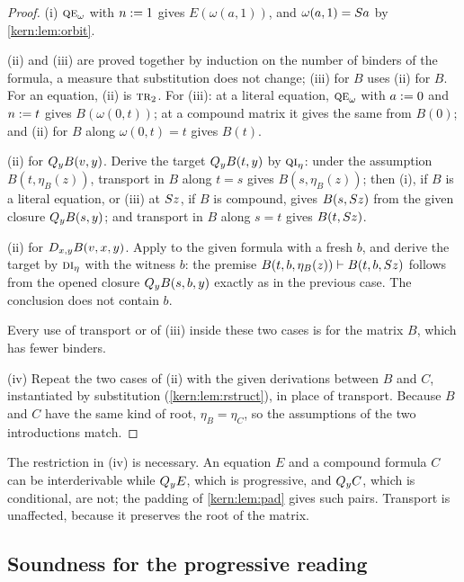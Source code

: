 \begin{proof}
(i) $\rulename{QE}_{\omega}$ with $n\mathrel{:=} 1$ gives $E(\omega(a,1))$, and
$\omega(a,1)=S a$ by \cref{kern:lem:orbit}.

(ii) and (iii) are proved together by induction on the number of binders of
the formula, a measure that substitution does not change; (iii) for $B$ uses
(ii) for $B$.  For an equation, (ii) is $\rulename{Tr}_{2}$.  For (iii): at
a literal equation, $\rulename{QE}_{\omega}$ with $a\mathrel{:=} 0$ and
$n\mathrel{:=} t$ gives $B(\omega(0,t))$; at a compound matrix it gives the same
from $B(0)$; and (ii) for $B$ along $\omega(0,t)=t$ gives $B(t)$.

(ii) for $Q_{y}B(v,y)$.  Derive the target $Q_{y}B(t,y)$ by
$\rulename{QI}_{\eta}$: under the assumption $B(t,\eta_B(z))$, transport in
$B$ along $t=s$ gives $B(s,\eta_B(z))$; then (i), if $B$ is a literal
equation, or (iii) at $S z$, if $B$ is compound, gives $B(s,S z)$ from
the given closure $Q_{y}B(s,y)$; and transport in $B$ along $s=t$ gives
$B(t,S z)$.

(ii) for $D_{x,y}B(v,x,y)$.  Apply  to the given formula with
a fresh $b$, and derive the target by $\rulename{DI}_{\eta}$ with the
witness $b$: the premise
$B(t,b,\eta_B(z))\vdash B(t,b,S z)$ follows from the opened closure
$Q_{y}B(s,b,y)$ exactly as in the previous case.  The conclusion does not
contain $b$.

Every use of transport or of (iii) inside these two cases is for the matrix
$B$, which has fewer binders.

(iv) Repeat the two cases of (ii) with the given derivations between $B$
and $C$, instantiated by substitution (\cref{kern:lem:rstruct}), in place
of transport.  Because $B$ and $C$ have the same kind of root,
$\eta_B=\eta_C$, so the assumptions of the two introductions match.
\end{proof}

The restriction in (iv) is necessary.  An equation $E$ and a compound
formula $C$ can be interderivable while $Q_{y}E$, which is progressive, and
$Q_{y}C$, which is conditional, are not; the padding of
\cref{kern:lem:pad} gives such pairs.  Transport is unaffected, because it
preserves the root of the matrix.

\subsection{Soundness for the progressive reading}
\label{kern:sec:Rsound}

